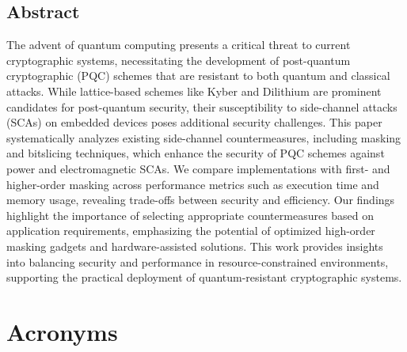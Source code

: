 \documentclass[a4paper,12pt,twoside,openany,headsepline,bibliography=totocnumbered]{scrbook}
\begin{document}


\section*{Abstract}

The advent of quantum computing presents a critical threat to current cryptographic systems, necessitating the development of post-quantum cryptographic (PQC) schemes that are resistant to both quantum and classical attacks. While lattice-based schemes like Kyber and Dilithium are prominent candidates for post-quantum security, their susceptibility to side-channel attacks (SCAs) on embedded devices poses additional security challenges. This paper systematically analyzes existing side-channel countermeasures, including masking and bitslicing techniques, which enhance the security of PQC schemes against power and electromagnetic SCAs. We compare implementations with first- and higher-order masking across performance metrics such as execution time and memory usage, revealing trade-offs between security and efficiency. Our findings highlight the importance of selecting appropriate countermeasures based on application requirements, emphasizing the potential of optimized high-order masking gadgets and hardware-assisted solutions. This work provides insights into balancing security and performance in resource-constrained environments, supporting the practical deployment of quantum-resistant cryptographic systems.

\tableofcontents

\chapter*{Acronyms}
\begin{acronym}[PQC]
\end{acronym}






\newpage
\listoffigures
\listoftables

\backmatter



\end{document}
